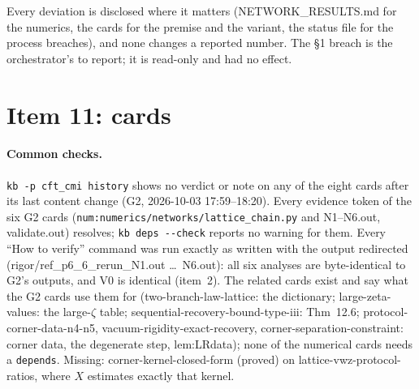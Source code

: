 \documentclass[11pt]{article}
\begin{document}
\begin{verdictok}
Every deviation is disclosed where it matters (NETWORK\_RESULTS.md for the numerics, the cards for the premise and
the variant, the status file for the process breaches), and none changes a reported number. The \S1 breach is the
orchestrator's to report; it is read-only and had no effect.
\end{verdictok}

\section{Item 11: cards}\label{sec:i11}
\paragraph{Common checks.} \texttt{kb -p cft\_cmi history} shows no verdict or note on any of the eight cards after
its last content change (G2, 2026-10-03 17:59--18:20). Every evidence token of the six G2 cards
(\texttt{num:numerics/networks/lattice\_chain.py} and N1--N6.out, validate.out) resolves; \texttt{kb deps -{}-check}
reports no warning for them. Every ``How to verify'' command was run exactly as written with the output redirected
(rigor/ref\_p6\_6\_rerun\_N1.out \ldots\ N6.out): all six analyses are byte-identical to G2's outputs, and V0 is
identical (item~2). The related cards exist and say what the G2 cards use them for (two-branch-law-lattice: the
dictionary; large-zeta-values: the large-$\zeta$ table; sequential-recovery-bound-type-iii: Thm~12.6;
protocol-corner-data-n4-n5, vacuum-rigidity-exact-recovery, corner-separation-constraint: corner data, the degenerate
step, lem:LRdata); none of the numerical cards needs a \texttt{depends}. Missing: corner-kernel-closed-form
(proved) on lattice-vwz-protocol-ratios, where $X$ estimates exactly that kernel.
\end{document}
